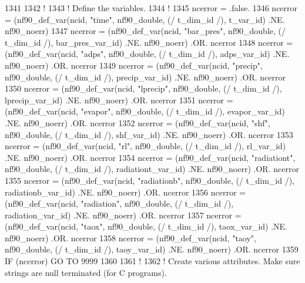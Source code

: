 \begin{DoxyCode}
1341 
1342     \textcolor{comment}{!}
1343     \textcolor{comment}{! Define the variables.}
1344     \textcolor{comment}{!}
1345     ncerror = .false.
1346     ncerror = (nf90\_def\_var(ncid, \textcolor{stringliteral}{"time"}, nf90\_double, (/ t\_dim\_id /), t\_var\_id)                    .NE. 
      nf90\_noerr)
1347     ncerror = (nf90\_def\_var(ncid, \textcolor{stringliteral}{"bar\_pres"}, nf90\_double, (/ t\_dim\_id /), bar\_pres\_var\_id)         .NE. 
      nf90\_noerr) .OR. ncerror
1348     ncerror = (nf90\_def\_var(ncid, \textcolor{stringliteral}{"adps"}, nf90\_double, (/ t\_dim\_id /), adps\_var\_id)                 .NE. 
      nf90\_noerr) .OR. ncerror
1349     ncerror = (nf90\_def\_var(ncid, \textcolor{stringliteral}{"precip"}, nf90\_double, (/ t\_dim\_id /), precip\_var\_id)             .NE. 
      nf90\_noerr) .OR. ncerror
1350     ncerror = (nf90\_def\_var(ncid, \textcolor{stringliteral}{"lprecip"}, nf90\_double, (/ t\_dim\_id /), lprecip\_var\_id)           .NE. 
      nf90\_noerr) .OR. ncerror
1351     ncerror = (nf90\_def\_var(ncid, \textcolor{stringliteral}{"evapor"}, nf90\_double, (/ t\_dim\_id /), evapor\_var\_id)             .NE. 
      nf90\_noerr) .OR. ncerror
1352     ncerror = (nf90\_def\_var(ncid, \textcolor{stringliteral}{"shf"}, nf90\_double, (/ t\_dim\_id /), shf\_var\_id)                   .NE. 
      nf90\_noerr) .OR. ncerror
1353     ncerror = (nf90\_def\_var(ncid, \textcolor{stringliteral}{"rl"}, nf90\_double, (/ t\_dim\_id /), rl\_var\_id)                     .NE. 
      nf90\_noerr) .OR. ncerror
1354     ncerror = (nf90\_def\_var(ncid, \textcolor{stringliteral}{"radiationt"}, nf90\_double, (/ t\_dim\_id /), radiationt\_var\_id)     .NE. 
      nf90\_noerr) .OR. ncerror
1355     ncerror = (nf90\_def\_var(ncid, \textcolor{stringliteral}{"radiationb"}, nf90\_double, (/ t\_dim\_id /), radiationb\_var\_id)     .NE. 
      nf90\_noerr) .OR. ncerror
1356     ncerror = (nf90\_def\_var(ncid, \textcolor{stringliteral}{"radiation"}, nf90\_double, (/ t\_dim\_id /), radiation\_var\_id)       .NE. 
      nf90\_noerr) .OR. ncerror
1357     ncerror = (nf90\_def\_var(ncid, \textcolor{stringliteral}{"taox"}, nf90\_double, (/ t\_dim\_id /), taox\_var\_id)                 .NE. 
      nf90\_noerr) .OR. ncerror
1358     ncerror = (nf90\_def\_var(ncid, \textcolor{stringliteral}{"taoy"}, nf90\_double, (/ t\_dim\_id /), taoy\_var\_id)                 .NE. 
      nf90\_noerr) .OR. ncerror
1359     \textcolor{keywordflow}{IF} (ncerror) \textcolor{keywordflow}{GO TO} 9999
1360 
1361     \textcolor{comment}{!}
1362     \textcolor{comment}{! Create various attributes. Make sure strings are null terminated (for C programs).}

\end{DoxyCode}
